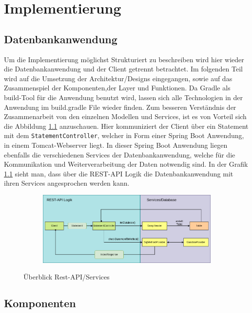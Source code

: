 \chapter{Implementierung}
\label{Implementierung}

\section{Datenbankanwendung}

Um die Implementierung möglichst Strukturiert zu beschreiben wird hier wieder die Datenbankanwendung und der Client getrennt betrachtet.
Im folgenden Teil wird auf die Umsetzung der Architektur/Designs eingegangen, sowie auf das Zusammenspiel der Komponenten,der Layer und Funktionen.
Da Gradle als build-Tool für die Anwendung benutzt wird, lassen sich alle Technologien in der Anwendung im build.gradle File wieder finden. 
Zum besseren Verständnis der Zusammenarbeit von den einzelnen Modellen und Services, ist es von Vorteil sich die Abbildung \ref{graf_3} anzuschauen.
Hier kommuniziert der Client über ein Statement mit dem \texttt{StatementController}, welcher in Form einer Spring Boot Anwendung, in einem Tomcat-Webserver liegt.
In dieser Spring Boot Anwendung liegen ebenfalls die verschiedenen Services der Datenbankanwendung, welche für die Kommunikation und Weiterverarbeitung der Daten notwendig sind. In der Grafik \ref{graf_3} sieht man, dass über die REST-API Logik die Datenbankanwendung mit ihren Services angesprochen werden kann.

\begin{figure}[h]
  \centering
  \begin{subfigure}[b]{1.0\textwidth}
    \includegraphics[width=1.0\linewidth]{img/logic}
  \end{subfigure}
  \caption{Überblick Rest-API/Services}
  \label{graf_3}
\end{figure}

\section{Komponenten}


